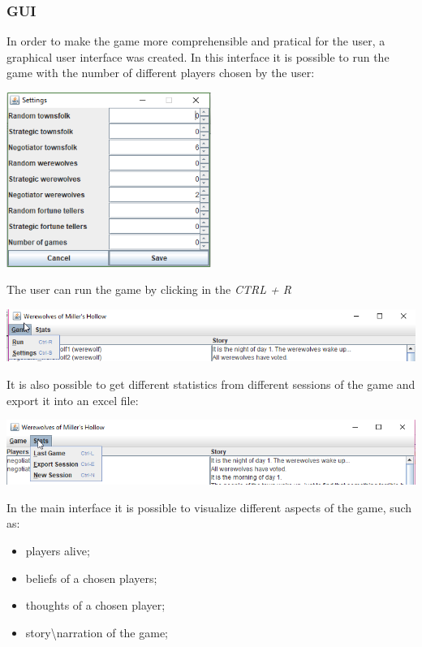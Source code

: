 \documentclass{article}
\begin{document}
\subsubsection{GUI}
In order to make the game more comprehensible and pratical for the user, a graphical user interface was created. 
In this interface it is possible to run the game with the number of different players chosen by the user:\newline
\begin{center}
\includegraphics[width=0.5\textwidth]{./images/settings.png}\par\vspace{1cm}
\end{center}
The user can run the game by clicking in the \textit{CTRL + R}
\begin{center}
\includegraphics[width=1\textwidth]{./images/game_button.png}\par\vspace{1cm}
\end{center}
It is also possible to get different statistics from different sessions of the game and export it into an excel file:
\begin{center}
\includegraphics[width=1\textwidth]{./images/stats_button.png}\par\vspace{1cm}
\end{center}
In the main interface it is possible to visualize different aspects of the game, such as:
\begin{itemize}
	\item players alive;
	\item beliefs of a chosen players;
	\item thoughts of a chosen player;
	\item story\textbackslash narration of the game;
\end{itemize}
\end{document}
